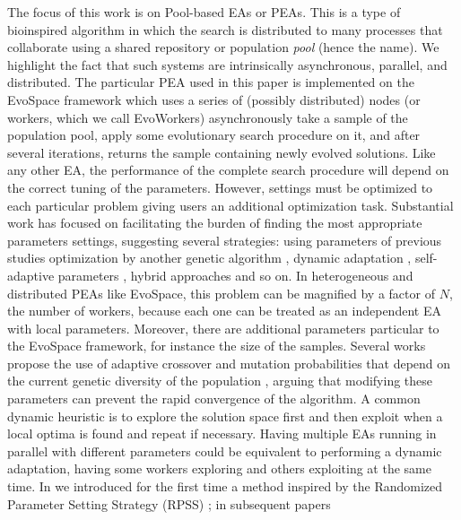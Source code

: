 \documentclass[conference]{IEEEtran}
\begin{document}
The focus of this work is on Pool-based EAs or PEAs. This is a type of
bioinspired algorithm in which the search
is distributed to many processes that collaborate using a shared
repository or population {\em pool} (hence the name). We highlight the fact that such
systems are intrinsically asynchronous, parallel, and distributed.
The particular PEA used in this paper is implemented on
the EvoSpace framework \cite{GValdez2015} which uses a series of
(possibly distributed) nodes (or workers, which we call EvoWorkers) 
asynchronously take a sample of the population pool, apply some 
evolutionary search procedure 
on it, and after several iterations, returns the sample containing 
newly evolved solutions.
Like any other EA, the performance of the complete search procedure will depend
on the correct tuning of the parameters. However, settings
must be optimized to each particular problem \cite{de2007parameter}
giving users an additional optimization task.
Substantial work has focused on facilitating the burden of finding
the most appropriate parameters settings, suggesting several strategies:
using parameters of previous studies \cite{eiben1999parameter}
optimization by another genetic algorithm \cite{grefenstette1986optimization},
dynamic adaptation \cite{eiben1999parameter},
self-adaptive parameters \cite{pellerin2004self}, hybrid approaches \cite{de2007parameter} and so on.
In heterogeneous and distributed PEAs like EvoSpace, this problem can
be magnified by a factor of $N$, the number of workers, because each one
can be treated as an independent EA with local parameters. Moreover, there
are additional parameters particular to the EvoSpace framework,
for instance the size of the samples.
Several works propose the use of adaptive crossover and mutation probabilities
that depend on the current genetic diversity of the population \cite{pellerin2004self},
arguing that modifying these parameters can prevent the rapid convergence of the
algorithm.
A common dynamic heuristic is to explore the solution space first and then exploit
when a local optima is found and repeat if necessary.
Having multiple EAs running in parallel with different parameters could be
equivalent to performing a dynamic adaptation, having some workers exploring
and others exploiting at the same time.
In \cite{LNCS86720702} we introduced for the first time a method
inspired by the Randomized Parameter
Setting Strategy (RPSS) \cite{fuku1,fuku2}; in subsequent papers
\end{document}
